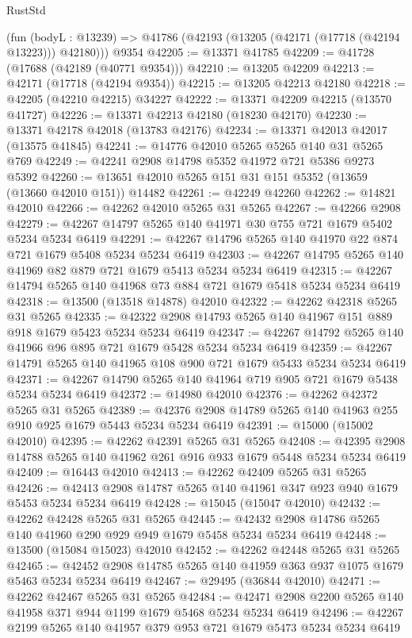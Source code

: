 \begin{lexlean}{RustStd}
\begin{coremodule}
    (fun (bodyL : @13239) => @41786 (@42193 (@13205 (@42171 (@17718 (@42194 @13223))) @42180)))
    @9354
@42205 := @13371 @41785
@42209 := @41728 (@17688 (@42189 (@40771 @9354)))
@42210 := @13205 @42209
@42213 := @42171 (@17718 (@42194 @9354))
@42215 := @13205 @42213 @42180
@42218 := @42205 (@42210 @42215) @34227
@42222 := @13371 @42209 @42215 (@13570 @41727)
@42226 := @13371 @42213 @42180 (@18230 @42170)
@42230 := @13371 @42178 @42018 (@13783 @42176)
@42234 := @13371 @42013 @42017 (@13575 @41845)
@42241 := @14776 @42010 @5265 @5265 @140 @31 @5265 @769
@42249 := @42241 @2908 @14798 @5352 @41972 @721 @5386 @9273 @5392
@42260 := @13651 @42010 @5265 @151 @31 @151 @5352 (@13659 (@13660 @42010 @151)) @14482
@42261 := @42249 @42260
@42262 := @14821 @42010
@42266 := @42262 @42010 @5265 @31 @5265
@42267 := @42266 @2908
@42279 := @42267 @14797 @5265 @140 @41971 @30 @755 @721 @1679 @5402 @5234 @5234 @6419
@42291 := @42267 @14796 @5265 @140 @41970 @22 @874 @721 @1679 @5408 @5234 @5234 @6419
@42303 := @42267 @14795 @5265 @140 @41969 @82 @879 @721 @1679 @5413 @5234 @5234 @6419
@42315 := @42267 @14794 @5265 @140 @41968 @73 @884 @721 @1679 @5418 @5234 @5234 @6419
@42318 := @13500 (@13518 @14878) @42010
@42322 := @42262 @42318 @5265 @31 @5265
@42335 := @42322 @2908 @14793 @5265 @140 @41967 @151 @889 @918 @1679 @5423 @5234 @5234 @6419
@42347 := @42267 @14792 @5265 @140 @41966 @96 @895 @721 @1679 @5428 @5234 @5234 @6419
@42359 := @42267 @14791 @5265 @140 @41965 @108 @900 @721 @1679 @5433 @5234 @5234 @6419
@42371 := @42267 @14790 @5265 @140 @41964 @719 @905 @721 @1679 @5438 @5234 @5234 @6419
@42372 := @14980 @42010
@42376 := @42262 @42372 @5265 @31 @5265
@42389 := @42376 @2908 @14789 @5265 @140 @41963 @255 @910 @925 @1679 @5443 @5234 @5234 @6419
@42391 := @15000 (@15002 @42010)
@42395 := @42262 @42391 @5265 @31 @5265
@42408 := @42395 @2908 @14788 @5265 @140 @41962 @261 @916 @933 @1679 @5448 @5234 @5234 @6419
@42409 := @16443 @42010
@42413 := @42262 @42409 @5265 @31 @5265
@42426 := @42413 @2908 @14787 @5265 @140 @41961 @347 @923 @940 @1679 @5453 @5234 @5234 @6419
@42428 := @15045 (@15047 @42010)
@42432 := @42262 @42428 @5265 @31 @5265
@42445 := @42432 @2908 @14786 @5265 @140 @41960 @290 @929 @949 @1679 @5458 @5234 @5234 @6419
@42448 := @13500 (@15084 @15023) @42010
@42452 := @42262 @42448 @5265 @31 @5265
@42465 := @42452 @2908 @14785 @5265 @140 @41959 @363 @937 @1075 @1679 @5463 @5234 @5234 @6419
@42467 := @29495 (@36844 @42010)
@42471 := @42262 @42467 @5265 @31 @5265
@42484 := @42471 @2908 @2200 @5265 @140 @41958 @371 @944 @1199 @1679 @5468 @5234 @5234 @6419
@42496 := @42267 @2199 @5265 @140 @41957 @379 @953 @721 @1679 @5473 @5234 @5234 @6419

\end{coremodule}
\end{lexlean}

